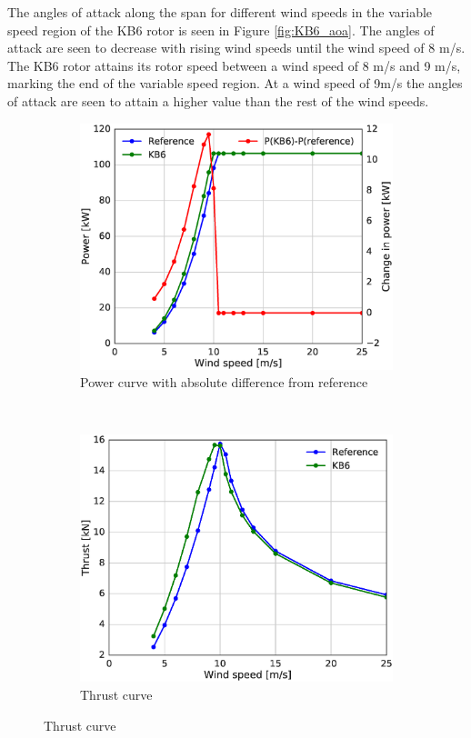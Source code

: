 The angles of attack along the span for different wind speeds in the variable speed region of the KB6 rotor is seen in Figure \ref{fig:KB6_aoa}. The angles of attack are seen to decrease with rising wind speeds until the wind speed of 8 m/s. The KB6 rotor attains its rotor speed between a wind speed of 8 m/s and 9 m/s, marking the end of the variable speed region. At a wind speed of 9m/s the angles of attack are seen to attain a higher value than the rest of the wind speeds. %
\begin{figure}[tph]
\begin{subfigure}{0.50\textwidth}
\includegraphics[width=\linewidth]{figures/KB6_final/KB6_power_diff_HS2.eps}
\caption{Power curve with absolute difference from reference}
\label{subfig:KB6_pcurve}
\end{subfigure}
 ~
\begin{subfigure}{0.50\textwidth}
\includegraphics[width=\linewidth]{figures/KB6_final/KB6_thrust_HS2.eps}
\caption{Thrust curve}
\label{subfig:KB6_thrust}
\end{subfigure}


\end{figure}
